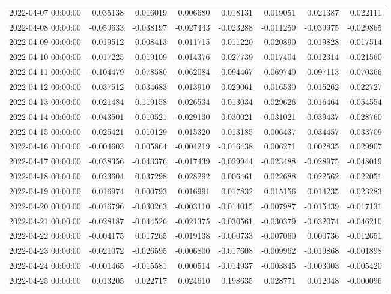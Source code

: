 \begin{tabular}{lrrrrrrr}
2022-04-07 00:00:00 & 0.035138 & 0.016019 & 0.006680 & 0.018131 & 0.019051 & 0.021387 & 0.022111 \\
2022-04-08 00:00:00 & -0.059633 & -0.038197 & -0.027443 & -0.023288 & -0.011259 & -0.039975 & -0.029865 \\
2022-04-09 00:00:00 & 0.019512 & 0.008413 & 0.011715 & 0.011220 & 0.020890 & 0.019828 & 0.017514 \\
2022-04-10 00:00:00 & -0.017225 & -0.019109 & -0.014376 & 0.027739 & -0.017404 & -0.012314 & -0.021560 \\
2022-04-11 00:00:00 & -0.104479 & -0.078580 & -0.062084 & -0.094467 & -0.069740 & -0.097113 & -0.070366 \\
2022-04-12 00:00:00 & 0.037512 & 0.034683 & 0.013910 & 0.029061 & 0.016530 & 0.015262 & 0.022727 \\
2022-04-13 00:00:00 & 0.021484 & 0.119158 & 0.026534 & 0.013034 & 0.029626 & 0.016464 & 0.054554 \\
2022-04-14 00:00:00 & -0.043501 & -0.010521 & -0.029130 & 0.030021 & -0.031021 & -0.039437 & -0.028760 \\
2022-04-15 00:00:00 & 0.025421 & 0.010129 & 0.015320 & 0.013185 & 0.006437 & 0.034457 & 0.033709 \\
2022-04-16 00:00:00 & -0.004603 & 0.005864 & -0.004219 & -0.016438 & 0.006271 & 0.002835 & 0.029907 \\
2022-04-17 00:00:00 & -0.038356 & -0.043376 & -0.017439 & -0.029944 & -0.023488 & -0.028975 & -0.048019 \\
2022-04-18 00:00:00 & 0.023604 & 0.037298 & 0.028292 & 0.006461 & 0.022688 & 0.022562 & 0.022051 \\
2022-04-19 00:00:00 & 0.016974 & 0.000793 & 0.016991 & 0.017832 & 0.015156 & 0.014235 & 0.023283 \\
2022-04-20 00:00:00 & -0.016796 & -0.030263 & -0.003110 & -0.014015 & -0.007987 & -0.015439 & -0.017131 \\
2022-04-21 00:00:00 & -0.028187 & -0.044526 & -0.021375 & -0.030561 & -0.030379 & -0.032074 & -0.046210 \\
2022-04-22 00:00:00 & -0.004175 & 0.017265 & -0.019138 & -0.000733 & -0.007060 & 0.000736 & -0.012651 \\
2022-04-23 00:00:00 & -0.021072 & -0.026595 & -0.006800 & -0.017608 & -0.009962 & -0.019868 & -0.001898 \\
2022-04-24 00:00:00 & -0.001465 & -0.015581 & 0.000514 & -0.014937 & -0.003845 & -0.003003 & -0.005420 \\
2022-04-25 00:00:00 & 0.013205 & 0.022717 & 0.024610 & 0.198635 & 0.028771 & 0.012048 & -0.000096 \\

\end{tabular}
